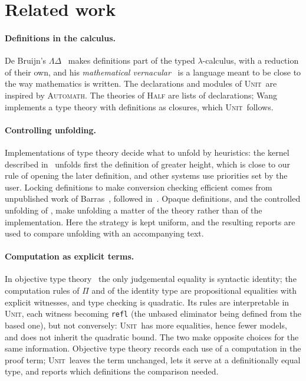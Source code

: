 \documentclass[11pt]{article}
\newcommand{\sys}{\textsc{Unit}}
\newcommand{\kw}[1]{\texttt{#1}}
\begin{document}
\section{Related work}\label{sec:related}

\paragraph{Definitions in the calculus.} De Bruijn's
$\Lambda\Delta$~\cite{LD} makes definitions part of the typed
$\lambda$-calculus, with a reduction of their own, and his
\emph{mathematical vernacular}~\cite{MV} is a language meant to be close
to the way mathematics is written. The declarations and
modules of \sys\ are inspired by \textsc{Automath}. The theories of \textsc{Half}
\cite{Ced} are lists of declarations; Wang~\cite{Wang} implements a type
theory with definitions as closures, which \sys\ follows.

\paragraph{Controlling unfolding.} Implementations of type theory decide
what to unfold by heuristics: the kernel described in~\cite{Lean4} unfolds
first the definition of greater height, which is close to our rule of
opening the later definition, and other systems use priorities set by
the user. Locking definitions to make conversion checking efficient
comes from unpublished work of Barras~\cite{Barras}, followed
in~\cite{Wang}. Opaque definitions, and the controlled unfolding of
\cite{CU}, make unfolding a matter of the theory rather than of the
implementation. Here the strategy is kept uniform, and the resulting
reports are used to compare unfolding with an accompanying text.

\paragraph{Computation as explicit terms.} In objective type
theory~\cite{OTT} the only judgemental equality is syntactic identity;
the computation rules of $\Pi$ and of the identity type are
propositional equalities with explicit witnesses, and type checking is
quadratic. Its rules are interpretable in \sys, each witness becoming
\kw{refl} (the unbased eliminator being defined from the based one),
but not conversely: \sys\ has more equalities, hence fewer models, and
does not inherit the quadratic bound. The two make opposite choices for
the same information. Objective type theory records each use of a
computation in the proof term; \sys\ leaves the term unchanged, lets it
serve at a definitionally equal type, and reports which definitions the
comparison needed.
\end{document}
